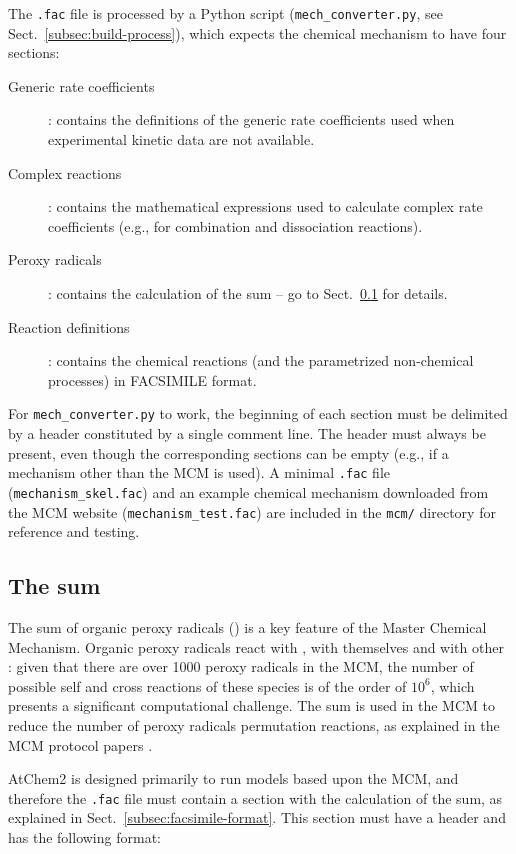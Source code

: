 The \texttt{.fac} file is processed by a Python script
(\texttt{mech\_converter.py}, see Sect.~\ref{subsec:build-process}),
which expects the chemical mechanism to have four sections:

\begin{description}
\item[Generic rate coefficients] : contains the definitions of the
  generic rate coefficients used when experimental kinetic data are
  not available.
\item[Complex reactions] : contains the mathematical expressions used
  to calculate complex rate coefficients (e.g., for combination and
  dissociation reactions).
\item[Peroxy radicals] : contains the calculation of the  sum
  -- go to Sect.~\ref{subsec:ro2-sum} for details.
\item[Reaction definitions] : contains the chemical reactions (and the
  parametrized non-chemical processes) in FACSIMILE format.
\end{description}

For \texttt{mech\_converter.py} to work, the beginning of each section
must be delimited by a header constituted by a single comment line.
The header must always be present, even though the corresponding
sections can be empty (e.g., if a mechanism other than the MCM is
used). A minimal \texttt{.fac} file (\texttt{mechanism\_skel.fac}) and
an example chemical mechanism downloaded from the MCM website
(\texttt{mechanism\_test.fac}) are included in the \texttt{mcm/}
directory for reference and testing.

\subsection{The  sum} \label{subsec:ro2-sum}

The sum of organic peroxy radicals () is a key feature of the
Master Chemical Mechanism. Organic peroxy radicals react with
, with themselves and with other : given that there
are over 1000 peroxy radicals in the MCM, the number of possible self
and cross reactions of these species is of the order of $10^6$, which
presents a significant computational challenge. The  sum is
used in the MCM to reduce the number of peroxy radicals permutation
reactions, as explained in the MCM protocol papers
\citep{jenkin_1997, saunders_2003}.

AtChem2 is designed primarily to run models based upon the MCM, and
therefore the \texttt{.fac} file must contain a section with the
calculation of the  sum, as explained in
Sect.~\ref{subsec:facsimile-format}. This section must have a header
and has the following format:

